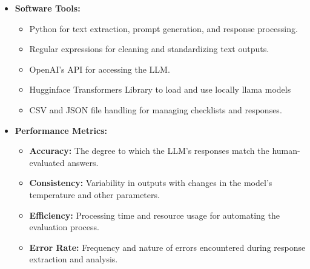 \documentclass[../main.tex]{subfiles}
\begin{document}
\begin{itemize}
    \item \textbf{Software Tools:}
    \begin{itemize}
        \item Python for text extraction, prompt generation, and response processing.
        \item Regular expressions for cleaning and standardizing text outputs.
        \item OpenAI's API for accessing the LLM.
        \item Hugginface Transformers Library to load and use locally llama models
        \item CSV and JSON file handling for managing checklists and responses.
    \end{itemize}
    \item \textbf{Performance Metrics:}
    \begin{itemize}
        \item \textbf{Accuracy:} The degree to which the LLM's responses match the human-evaluated answers.
        \item \textbf{Consistency:} Variability in outputs with changes in the model's temperature and other parameters.
        \item \textbf{Efficiency:} Processing time and resource usage for automating the evaluation process.
        \item \textbf{Error Rate:} Frequency and nature of errors encountered during response extraction and analysis.
    \end{itemize}
\end{itemize}
\end{document}
